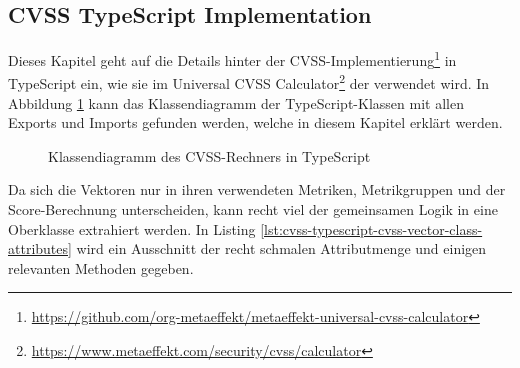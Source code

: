 \subsection{CVSS TypeScript Implementation} \label{subsec:projektbericht-loesungsweg-typescript-cvss-online-calculator}

Dieses Kapitel geht auf die Details hinter der CVSS-Implementierung\footnote{\url{https://github.com/org-metaeffekt/metaeffekt-universal-cvss-calculator}} in TypeScript ein, wie sie im Universal CVSS Calculator\footnote{\url{https://www.metaeffekt.com/security/cvss/calculator}} der {\metaeffekt} verwendet wird.
In Abbildung \ref{fig:cvss-ts-calculator-class-diagram} kann das Klassendiagramm der TypeScript-Klassen mit allen Exports und Imports gefunden werden, welche in diesem Kapitel erklärt werden.

\begin{figure}[htbp] %
    \centering
    \caption{Klassendiagramm des CVSS-Rechners in TypeScript}
    \label{fig:cvss-ts-calculator-class-diagram}
\end{figure}

Da sich die Vektoren nur in ihren verwendeten Metriken, Metrikgruppen und der Score-Berechnung unterscheiden, kann recht viel der gemeinsamen Logik in eine Oberklasse  extrahiert werden.
In Listing \ref{lst:cvss-typescript-cvss-vector-class-attributes} wird ein Ausschnitt der recht schmalen Attributmenge und einigen relevanten Methoden gegeben.

